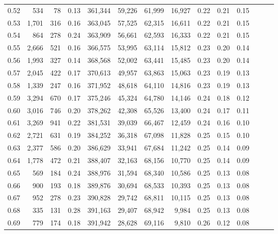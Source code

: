 \begin{tabular}{rrrrrrrrrrrrrr}
0.52 &     534 &     78 &  0.13 &  361,344 &   59,226 &  61,999 &  16,927 &  0.22 &  0.21 &      0.15 \\
0.53 &   1,701 &    316 &  0.16 &  363,045 &   57,525 &  62,315 &  16,611 &  0.22 &  0.21 &      0.15 \\
0.54 &     864 &    278 &  0.24 &  363,909 &   56,661 &  62,593 &  16,333 &  0.22 &  0.21 &      0.15 \\
0.55 &   2,666 &    521 &  0.16 &  366,575 &   53,995 &  63,114 &  15,812 &  0.23 &  0.20 &      0.14 \\
0.56 &   1,993 &    327 &  0.14 &  368,568 &   52,002 &  63,441 &  15,485 &  0.23 &  0.20 &      0.14 \\
0.57 &   2,045 &    422 &  0.17 &  370,613 &   49,957 &  63,863 &  15,063 &  0.23 &  0.19 &      0.13 \\
0.58 &   1,339 &    247 &  0.16 &  371,952 &   48,618 &  64,110 &  14,816 &  0.23 &  0.19 &      0.13 \\
0.59 &   3,294 &    670 &  0.17 &  375,246 &   45,324 &  64,780 &  14,146 &  0.24 &  0.18 &      0.12 \\
0.60 &   3,016 &    746 &  0.20 &  378,262 &   42,308 &  65,526 &  13,400 &  0.24 &  0.17 &      0.11 \\
0.61 &   3,269 &    941 &  0.22 &  381,531 &   39,039 &  66,467 &  12,459 &  0.24 &  0.16 &      0.10 \\
0.62 &   2,721 &    631 &  0.19 &  384,252 &   36,318 &  67,098 &  11,828 &  0.25 &  0.15 &      0.10 \\
0.63 &   2,377 &    586 &  0.20 &  386,629 &   33,941 &  67,684 &  11,242 &  0.25 &  0.14 &      0.09 \\
0.64 &   1,778 &    472 &  0.21 &  388,407 &   32,163 &  68,156 &  10,770 &  0.25 &  0.14 &      0.09 \\
0.65 &     569 &    184 &  0.24 &  388,976 &   31,594 &  68,340 &  10,586 &  0.25 &  0.13 &      0.08 \\
0.66 &     900 &    193 &  0.18 &  389,876 &   30,694 &  68,533 &  10,393 &  0.25 &  0.13 &      0.08 \\
0.67 &     952 &    278 &  0.23 &  390,828 &   29,742 &  68,811 &  10,115 &  0.25 &  0.13 &      0.08 \\
0.68 &     335 &    131 &  0.28 &  391,163 &   29,407 &  68,942 &   9,984 &  0.25 &  0.13 &      0.08 \\
0.69 &     779 &    174 &  0.18 &  391,942 &   28,628 &  69,116 &   9,810 &  0.26 &  0.12 &      0.08 \\

\end{tabular}
